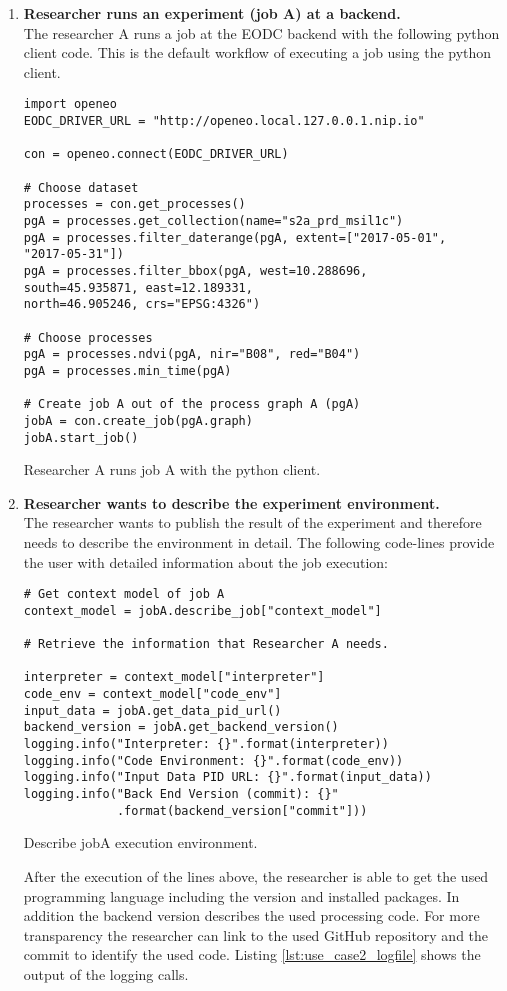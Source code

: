 \documentclass[draft,final]{vutinfth} %
\newenvironment{code}{\captionsetup{type=listing}}{}
\begin{document}
\begin{enumerate}
	\item \textbf{Researcher runs an experiment (job A) at a backend.}\\
	The researcher A runs a job at the EODC backend with the following python client code. This is the default workflow of executing a job using the python client.  

\begin{code}
	\begin{verbatim}
import openeo
EODC_DRIVER_URL = "http://openeo.local.127.0.0.1.nip.io"

con = openeo.connect(EODC_DRIVER_URL)

# Choose dataset
processes = con.get_processes()
pgA = processes.get_collection(name="s2a_prd_msil1c")
pgA = processes.filter_daterange(pgA, extent=["2017-05-01", 
"2017-05-31"])
pgA = processes.filter_bbox(pgA, west=10.288696, 
south=45.935871, east=12.189331, 
north=46.905246, crs="EPSG:4326")

# Choose processes
pgA = processes.ndvi(pgA, nir="B08", red="B04")
pgA = processes.min_time(pgA)

# Create job A out of the process graph A (pgA)
jobA = con.create_job(pgA.graph)
jobA.start_job()
	\end{verbatim}
	\caption{Researcher A runs job A with the python client.}
	\label{lst:impl_usecase2_1}
\end{code}
	\item \textbf{Researcher wants to describe the experiment environment.}\\
	The researcher wants to publish the result of the experiment and therefore needs to describe the environment in detail. The following code-lines provide the user with detailed information about the job execution:

\begin{code}
	\begin{verbatim}
# Get context model of job A
context_model = jobA.describe_job["context_model"]

# Retrieve the information that Researcher A needs.

interpreter = context_model["interpreter"]
code_env = context_model["code_env"]
input_data = jobA.get_data_pid_url()
backend_version = jobA.get_backend_version()
logging.info("Interpreter: {}".format(interpreter))
logging.info("Code Environment: {}".format(code_env))
logging.info("Input Data PID URL: {}".format(input_data))
logging.info("Back End Version (commit): {}"
             .format(backend_version["commit"]))
	\end{verbatim}
	\caption{Describe jobA execution environment.}
	\label{lst:impl_usecase2_2}
\end{code}
	After the execution of the lines above, the researcher is able to get the used programming language including the version and installed packages. In addition the backend version describes the used processing code. For more transparency the researcher can link to the used GitHub repository and the commit to identify the used code. Listing \ref{lst:use_case2_logfile} shows the output of the logging calls. 
	
\end{enumerate}
\end{document}

